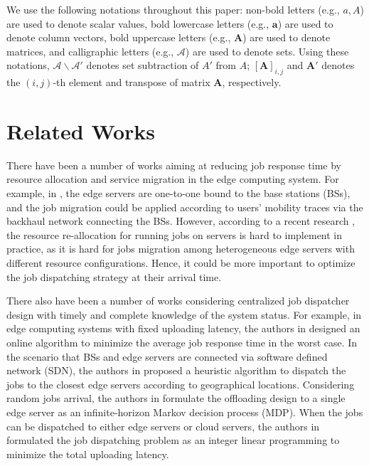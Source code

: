We use the following notations throughout this paper: 
non-bold letters (e.g., $a, A$) are used to denote scalar values,
bold lowercase letters (e.g., $\mathbf{a}$) are used to denote column vectors,
bold uppercase letters (e.g., $\mathbf{A}$) are used to denote matrices,
and calligraphic letters (e.g., $\mathcal{A}$) are used to denote sets.
Using these notations, $\mathcal{A}\backslash\mathcal{A'}$ denotes set subtraction of $A'$ from $A$; $[\mathbf{A}]_{i,j}$ and $\mathbf{A}'$ denotes the $(i,j)$-th element and transpose of matrix $\mathbf{A}$, respectively.

\section{Related Works}
\label{sec:review}
There have been a number of works aiming at reducing job response time by resource allocation and service migration in the edge computing system.
For example, in \cite{TON19-WangSq}, the edge servers are one-to-one bound to the base stations (BSs), and the job migration could be applied according to users' mobility traces via the backhaul network connecting the BSs.
However, according to a recent research \cite{INFOCOM19-WuC}, the resource re-allocation for running jobs on servers is hard to implement in practice, as it is hard for jobs migration among heterogeneous edge servers with different resource configurations.
Hence, it could be more important to optimize the job dispatching strategy at their arrival time.

There also have been a number of works considering centralized job dispatcher design with timely and complete knowledge of the system status.
For example, in edge computing systems with fixed uploading latency, the authors in \cite{tan-online} designed an online algorithm to minimize the average job response time in the worst case.
In the scenario that BSs and edge servers are connected via software defined network (SDN), the authors in \cite{IOTJ18-FanQ} proposed a heuristic algorithm to dispatch the jobs to the closest edge servers according to geographical locations.
Considering random jobs arrival, the authors in \cite{mdp-globecom,mdp-tvt} formulate the offloading design to a single edge server as an infinite-horizon Markov decision process (MDP).
When the jobs can be dispatched to either edge servers or cloud servers, the authors in \cite{MASS18-MengZ} formulated the job dispatching problem as an integer linear programming to minimize the total uploading latency. %

